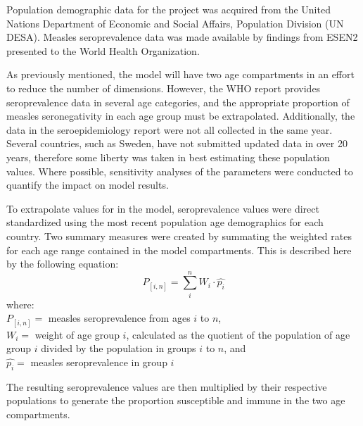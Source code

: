 \documentclass[../Paper.tex]{subfiles}
\begin{document}
\justifying
Population demographic data for the project was acquired from the United Nations
Department of Economic and Social Affairs, Population Division (UN DESA). Measles
seroprevalence data was made available by findings from ESEN2 presented to the World
Health Organization.

As previously mentioned, the model will have two age compartments in an effort to
reduce the number of dimensions. However, the WHO report provides seroprevalence data
in several age categories, and the appropriate proportion of measles seronegativity
in each age group must be extrapolated. Additionally, the data in the
seroepidemiology report were not all collected in the same year.
Several countries, such as Sweden, have not submitted updated data in over 20 years,
therefore some liberty was taken in best estimating these population values.
Where possible, sensitivity analyses of the parameters were conducted to
quantify the impact on model results.

To extrapolate values for in the model, seroprevalence values were direct standardized
using the most recent population age demographics for each country. Two summary
measures were created by summating the weighted rates for each age range
contained in the model compartments. This is described here by the following
equation:
  \begin{equation}
    P_{[i,n]} =\sum_{i}^{n}W_{i}\cdot \widehat{p_{i}}
  \end{equation}
  where:\\
  $P_{[i,n]} =$ measles seroprevalence from ages $i$ to $n$, \\
  $W_{i} =$ weight of age group $i$, calculated as the quotient of the population
  of age group $i$ divided by the population in groups $i$ to $n$, and \\
  $\widehat{p_{i}} =$ measles seroprevalence in group $i$

The resulting seroprevalence values are then multiplied by their respective
populations to generate the proportion susceptible and immune in the two age
compartments.
\clearpage
\end{document}
